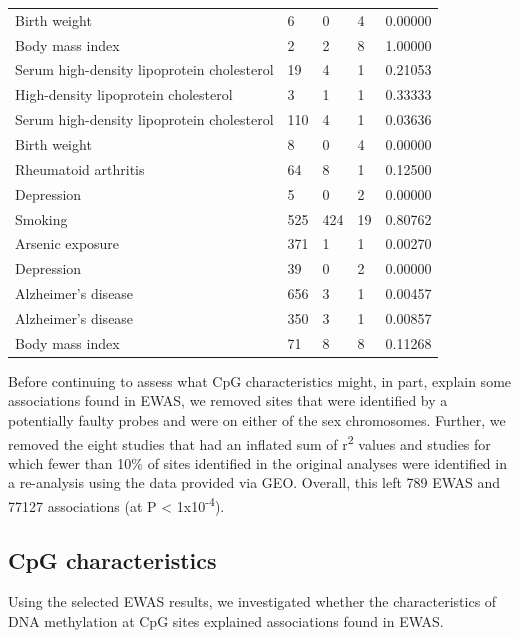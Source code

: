 \documentclass[11pt,oneside]{bristolthesis}
\begin{document}
\begin{table}
{\begin{tabular}[t]{lllll}
\rowcolor{gray!6}  Birth weight & 6 & 0 & 4 & 0.00000\\
Body mass index & 2 & 2 & 8 & 1.00000\\
\addlinespace
\rowcolor{gray!6}  Serum high-density lipoprotein cholesterol & 19 & 4 & 1 & 0.21053\\
High-density lipoprotein cholesterol & 3 & 1 & 1 & 0.33333\\
\rowcolor{gray!6}  Serum high-density lipoprotein cholesterol & 110 & 4 & 1 & 0.03636\\
Birth weight & 8 & 0 & 4 & 0.00000\\
\rowcolor{gray!6}  Rheumatoid arthritis & 64 & 8 & 1 & 0.12500\\
\addlinespace
Depression & 5 & 0 & 2 & 0.00000\\
\rowcolor{gray!6}  Smoking & 525 & 424 & 19 & 0.80762\\
Arsenic exposure & 371 & 1 & 1 & 0.00270\\
\rowcolor{gray!6}  Depression & 39 & 0 & 2 & 0.00000\\
Alzheimer's disease & 656 & 3 & 1 & 0.00457\\
\addlinespace
\rowcolor{gray!6}  Alzheimer's disease & 350 & 3 & 1 & 0.00857\\
Body mass index & 71 & 8 & 8 & 0.11268\\
\bottomrule
\end{tabular}}
\end{table}
\linebreak

Before continuing to assess what CpG characteristics might, in part, explain some associations found in EWAS, we removed sites that were identified by a potentially faulty probes and were on either of the sex chromosomes. Further, we removed the eight studies that had an inflated sum of r\textsuperscript{2} values and studies for which fewer than 10\% of sites identified in the original analyses were identified in a re-analysis using the data provided via GEO. Overall, this left 789 EWAS and 77127 associations (at P \textless{} 1x10\textsuperscript{-4}).

\hypertarget{cpg-characteristics}{%
\subsection{CpG characteristics}\label{cpg-characteristics}}

Using the selected EWAS results, we investigated whether the characteristics of DNA methylation at CpG sites explained associations found in EWAS.
\end{document}

